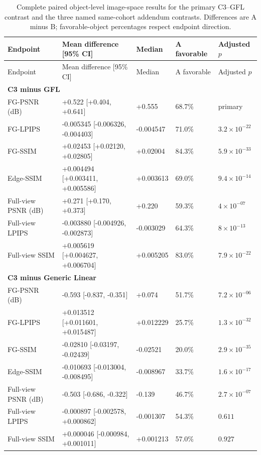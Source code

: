 \documentclass[11pt]{article}
\begin{document}
\begingroup\scriptsize
\begin{longtable}{p{2.5cm}p{4.0cm}p{1.5cm}p{1.5cm}p{1.6cm}}
\caption{Complete paired object-level image-space results for the primary C3--GFL contrast and the three named same-cohort addendum contrasts. Differences are A minus B; favorable-object percentages respect endpoint direction.}\label{tab:supp-freshc}\\
\toprule
Endpoint & Mean difference [95\% CI] & Median & A favorable & Adjusted $p$ \\
\midrule
\endfirsthead
\toprule Endpoint & Mean difference [95\% CI] & Median & A favorable & Adjusted $p$ \\
\midrule\endhead
\multicolumn{5}{l}{\textbf{C3 minus GFL}}\\
FG-PSNR (dB) & +0.522 [+0.404, +0.641] & +0.555 & 68.7\% & primary \\
FG-LPIPS & -0.005345 [-0.006326, -0.004403] & -0.004547 & 71.0\% & $3.2\times 10^{-22}$ \\
FG-SSIM & +0.02453 [+0.02120, +0.02805] & +0.02004 & 84.3\% & $5.9\times 10^{-33}$ \\
Edge-SSIM & +0.004494 [+0.003411, +0.005586] & +0.003613 & 69.0\% & $9.4\times 10^{-14}$ \\
Full-view PSNR (dB) & +0.271 [+0.170, +0.373] & +0.220 & 59.3\% & $4\times 10^{-07}$ \\
Full-view LPIPS & -0.003880 [-0.004926, -0.002873] & -0.003029 & 64.3\% & $8\times 10^{-13}$ \\
Full-view SSIM & +0.005619 [+0.004627, +0.006704] & +0.005205 & 83.0\% & $7.9\times 10^{-22}$ \\
\multicolumn{5}{l}{\textbf{C3 minus Generic Linear}}\\
FG-PSNR (dB) & -0.593 [-0.837, -0.351] & +0.074 & 51.7\% & $7.2\times 10^{-06}$ \\
FG-LPIPS & +0.013512 [+0.011601, +0.015487] & +0.012229 & 25.7\% & $1.3\times 10^{-32}$ \\
FG-SSIM & -0.02810 [-0.03197, -0.02439] & -0.02521 & 20.0\% & $2.9\times 10^{-35}$ \\
Edge-SSIM & -0.010693 [-0.013004, -0.008495] & -0.008967 & 33.7\% & $1.6\times 10^{-17}$ \\
Full-view PSNR (dB) & -0.503 [-0.686, -0.322] & -0.139 & 46.7\% & $2.7\times 10^{-07}$ \\
Full-view LPIPS & -0.000897 [-0.002578, +0.000862] & -0.001307 & 54.3\% & $0.611$ \\
Full-view SSIM & +0.000046 [-0.000984, +0.001011] & +0.001213 & 57.0\% & $0.927$ \\

\end{longtable}
\end{document}
